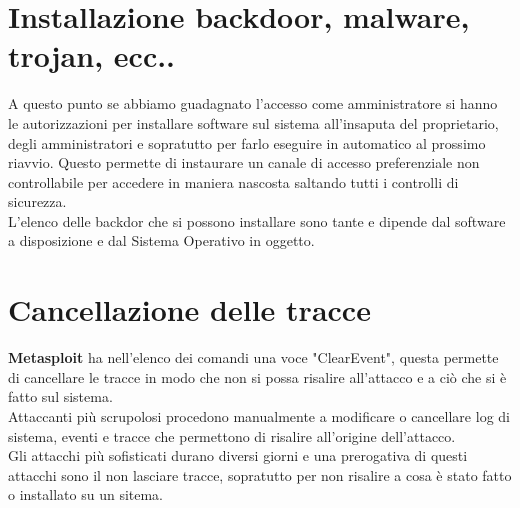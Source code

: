 \documentclass[a4paper,12pt]{article}
\begin{document}
\section{  Installazione backdoor, malware, trojan, ecc..}

A questo punto se abbiamo guadagnato l'accesso come amministratore si hanno le autorizzazioni per installare software sul sistema all'insaputa del proprietario, degli amministratori e sopratutto per farlo eseguire in automatico al prossimo riavvio. Questo permette di instaurare un canale di accesso preferenziale non controllabile per accedere in maniera nascosta saltando tutti i controlli di sicurezza. \\
L'elenco delle backdor che si possono installare sono tante e dipende dal software a disposizione e dal Sistema Operativo in oggetto.

\section{  Cancellazione delle tracce}

\textbf{Metasploit}\cite{metasploit} ha nell'elenco dei comandi una voce "ClearEvent", questa permette di cancellare le tracce in modo che non si possa risalire all'attacco e a ciò che si è fatto sul sistema.\\
Attaccanti più scrupolosi procedono manualmente  a modificare o cancellare log di sistema, eventi e tracce che permettono di risalire all'origine dell'attacco.\\
Gli attacchi più sofisticati durano diversi giorni e una prerogativa di questi attacchi sono il non lasciare tracce, sopratutto per non risalire a cosa è stato fatto o installato su un sitema.
\end{document}
